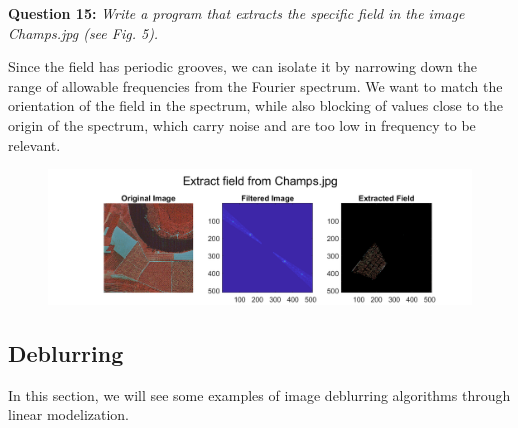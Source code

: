


\textbf{Question 15:}
\textit{Write a program that extracts the speciﬁc ﬁeld in the image Champs.jpg (see Fig. 5).}

Since the field has periodic grooves, we can isolate it by narrowing down the range of allowable frequencies from the Fourier spectrum. We want to match the orientation of the field in the spectrum, while also blocking of values close to the origin of the spectrum, which carry noise and are too low in frequency to be relevant.

\begin{figure}[H]
    \centering
    \includegraphics[width=\textwidth]{Doc/Graphics/Part1/Part1_Question15.png}
    \label{fig:enter-label}
\end{figure}


\subsection{Deblurring}
In this section, we will see some examples of image deblurring algorithms through linear modelization.

